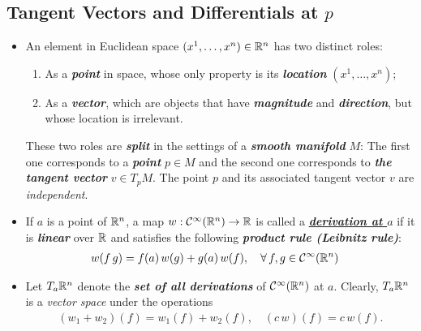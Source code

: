 \documentclass[11pt]{article}
\begin{document}
\subsection{Tangent Vectors and Differentials at $p$}
\begin{itemize}
 \item \begin{remark}
 An element in Euclidean space $(x^1, \ldots, x^n) \in {\mathbb R}^{n}$ has two distinct roles: 
\begin{enumerate}
\item As a \emph{\textbf{point}} in space, whose only property is its \emph{\textbf{location}} $(x^1, \ldots, x^n)$;
\item As a \emph{\textbf{vector}}, which are objects that have \emph{\textbf{magnitude}} and \emph{\textbf{direction}}, but whose location is irrelevant.
\end{enumerate} These two roles are \emph{\textbf{split}} in the settings of a \emph{\textbf{smooth manifold}} $M$:
The first one corresponds to a \emph{\textbf{point}} $p \in M$ and the second one corresponds to \emph{\textbf{the tangent vector}} $v \in T_pM$.  The point $p$ and its associated tangent vector $v$ are \emph{independent}. 
\end{remark}


\item \begin{definition}
If $a$ is a point of ${\mathbb R}^n$, a map $w: {\mathcal C}^{\infty}({\mathbb R}^n) \rightarrow {\mathbb R}$ is called a \underline{\emph{\textbf{derivation at $a$}}} if it is \emph{\textbf{linear}} over ${\mathbb R}$ and satisfies the following \emph{\textbf{product rule (Leibnitz rule)}}:
\begin{align}
w(f\,g) &= f(a)\,w(g) + g(a)\,w(f), \quad  \forall\,f,g \in {\mathcal C}^{\infty}({\mathbb R}^{n})  \label{eqn: derivation_def}
\end{align}
\end{definition}

\item \begin{remark}
Let $T_{a}{\mathbb R}^n$ denote the \emph{\textbf{set of all derivations}} of ${\mathcal C}^{\infty}({\mathbb R}^n)$ at $a$. Clearly, $T_{a}{\mathbb R}^n$  is a
\emph{vector space} under the operations
\begin{align*}
(w_1 + w_2)(f)  = w_1(f) + w_2(f), \quad (c\,w)(f) = c\,w(f).
\end{align*}
\end{remark}


\end{itemize}
\end{document}
